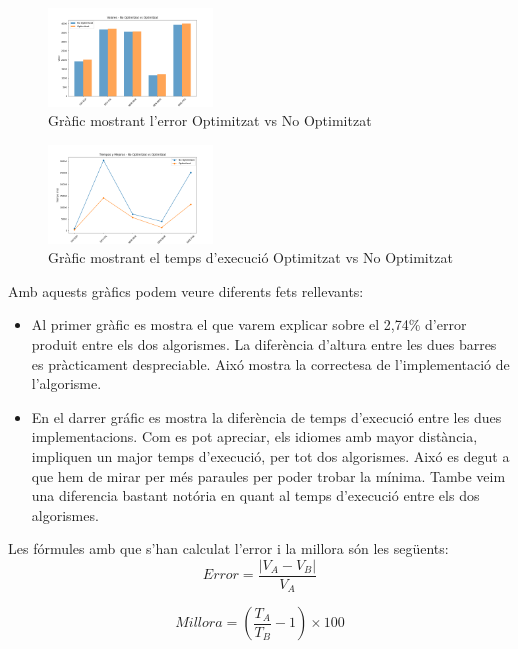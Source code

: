 \documentclass[conference]{IEEEtran}
\begin{document}
\begin{figure}[ht]
    \centering
    \includegraphics[width=0.388\textwidth]{images/Figure_1.png}
    \caption{Gràfic mostrant l'error Optimitzat vs No Optimitzat}
\end{figure}
\begin{figure}[ht]
    \centering
    \includegraphics[width=0.388\textwidth]{images/Figure_2.png}
    \caption{Gràfic mostrant el temps d'execució Optimitzat vs No Optimitzat}
\end{figure}
Amb aquests gràfics podem veure diferents fets rellevants:
\begin{itemize}
    \item Al primer gràfic es mostra el que varem explicar sobre el 2,74\% d'error produit entre els dos algorismes. La diferència d'altura entre les dues barres es pràcticament despreciable. Aixó mostra la correctesa de l'implementació de l'algorisme.
    \item En el darrer gráfic es mostra la diferència de temps d'execució entre les dues implementacions. Com es pot apreciar, els idiomes amb mayor distància, impliquen un major temps d'execució, per tot dos algorismes. Aixó es degut a que hem de mirar per més paraules per poder trobar la mínima. Tambe veim una diferencia bastant notória en quant al temps d'execució entre els dos algorismes.
\end{itemize}

Les fórmules amb que s'han calculat l'error i la millora són les següents:\\
\begin{equation}
Error = \frac{|V_A-V_B|}{V_A}
\label{eq:error}
\end{equation}

\begin{equation}
Millora = (\frac{T_A}{T_B}-1) \times 100
\label{eq:acceleration}
\end{equation}
\end{document}
